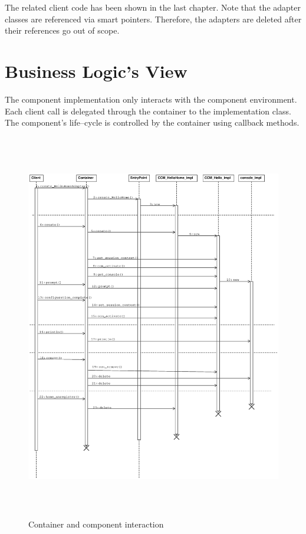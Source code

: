 \noindent
The related client code has been shown in the last chapter.
Note that the adapter classes are referenced via smart pointers. Therefore,
the adapters are deleted after their references go out of scope.


\section{Business Logic's View}

The component implementation only interacts with the component environment.
Each client call is delegated through the container to the implementation class.
The component's life--cycle is controlled by the container using callback methods.

\begin{figure}[htbp]
    \begin{center}
        \includegraphics [height=17cm,angle=0] {BusinessLogicView.eps}
        \caption{Container and component interaction}
        \label{BusinessLogicView}
    \end{center}
\end{figure}


